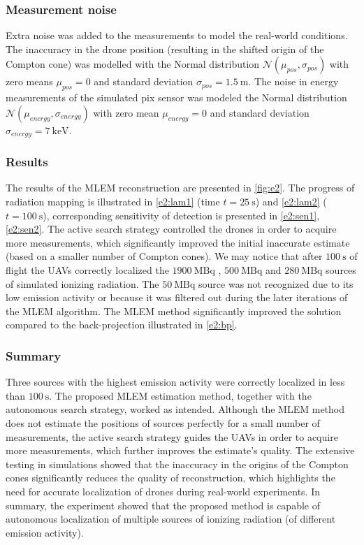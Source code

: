 \subsubsection{Measurement noise}
Extra noise was added to the measurements to model the real-world conditions.
The inaccuracy in the drone position (resulting in the shifted origin of the Compton cone) was modelled with the Normal distribution $\mathcal{N}(\mu_{pos}, \sigma_{pos})$ with zero means $\mu_{pos} = 0$ and standard deviation $\sigma_{pos} = \SI{1.5}{\meter}$. 
The noise in energy measurements of the simulated \ac{pix} sensor was modeled the Normal distribution $\mathcal{N}(\mu_{energy}, \sigma_{energy})$ with zero mean $\mu_{energy} = 0$ and standard deviation $\sigma_{energy} = \SI{7}{\kilo\electronvolt}$.

\subsubsection{Results}
The results of the \ac{MLEM} reconstruction are presented in \autoref{fig:e2}.
The progress of radiation mapping is illustrated in \autoref{e2:lam1} (time $t = \SI{25}{\second}$) and \autoref{e2:lam2} ($t = \SI{100}{\second}$), corresponding sensitivity of detection is presented in \autoref{e2:sen1}, \autoref{e2:sen2}.
The active search strategy controlled the drones in order to acquire more measurements, which significantly improved the initial inaccurate estimate (based on a smaller number of Compton cones).
We may notice that after $\SI{100}{\second}$ of flight the \ac{UAV}s correctly localized the $\SI{1900}{\mega\becquerel}$ , $\SI{500}{\mega\becquerel}$ and $\SI{280}{\mega\becquerel}$ sources of simulated ionizing radiation.
The $\SI{50}{\mega\becquerel}$ source was not recognized due to its low emission activity or because it was filtered out during the later iterations of the \ac{MLEM} algorithm.
The \ac{MLEM} method significantly improved the solution compared to the back-projection illustrated in \autoref{e2:bp}.

\subsubsection{Summary}
Three sources with the highest emission activity were correctly localized in less than $\SI{100}{\second}$.
The proposed \ac{MLEM} estimation method, together with the autonomous search strategy, worked as intended.
Although the \ac{MLEM} method does not estimate the positions of sources perfectly for a small number of measurements, the active search strategy guides the \ac{UAV}s in order to acquire more measurements, which further improves the estimate's quality.
The extensive testing in simulations showed that the inaccuracy in the origins of the Compton cones significantly reduces the quality of reconstruction, which highlights the need for accurate localization of drones during real-world experiments.
In summary, the experiment showed that the proposed method is capable of autonomous localization of multiple sources of ionizing radiation (of different emission activity).




